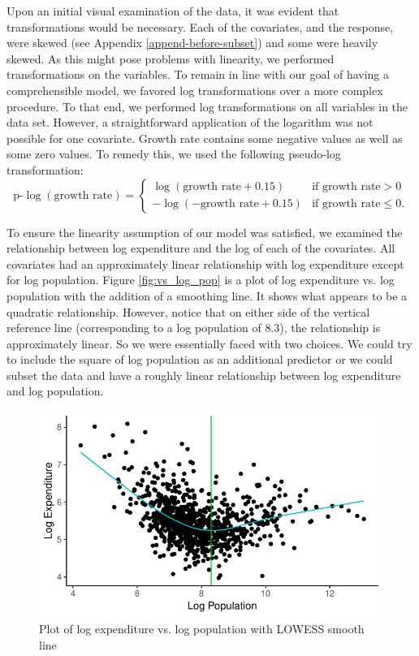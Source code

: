 \documentclass{article}\usepackage[]{graphicx}\usepackage[]{color}
\makeatletter
\def\maxwidth{ %
  \ifdim\Gin@nat@width>\linewidth
    \linewidth
  \else
    \Gin@nat@width
  \fi
}
\newenvironment{knitrout}{}{} %
\makeatother
\begin{document}
Upon an initial visual examination of the data, it was evident that transformations would be necessary. Each of the covariates, and the response, were skewed (see Appendix \ref{append-before-subset}) and some were heavily skewed. As this might pose problems with linearity, we performed transformations on the variables. To remain in line with our goal of having a comprehensible model, we favored log transformations over a more complex procedure. To that end, we performed log transformations on all variables in the data set.  However, a straightforward application of the logarithm was not possible for one covariate. Growth rate contains some negative values as well as some zero values. To remedy this, we used the following pseudo-log transformation:
\[
\text{p-}\log(\text{growth rate}) = %
  \begin{cases}
    \log(\text{growth rate} + 0.15) &\text{if growth rate} > 0 \\
    -\log(-\text{growth rate} + 0.15) &\text{if growth rate} \le 0.
  \end{cases}
\]

To ensure the linearity assumption of our model was satisfied, we examined the relationship between log expenditure and the log of each of the covariates. All covariates had an approximately linear relationship with log expenditure except for log population. Figure \ref{fig:vs_log_pop} is a plot of log expenditure vs. log population with the addition of a smoothing line. It shows what appears to be a quadratic relationship. However, notice that on either side of the vertical reference line (corresponding to a log population of $8.3$), the relationship is approximately linear. So we were essentially faced with two choices. We could try to include the square of log population as an additional predictor or we could subset the data and have a roughly linear relationship between log expenditure and log population.


\begin{knitrout}
\color{fgcolor}\begin{figure}[h]
\includegraphics[width=\maxwidth]{figure/r_fig_vs_log_pop-1} \caption{\label{fig:vs_log_pop} Plot of log expenditure vs. log population with LOWESS smooth line}\label{fig:r fig_vs_log_pop}
\end{figure}


\end{knitrout}
\end{document}
